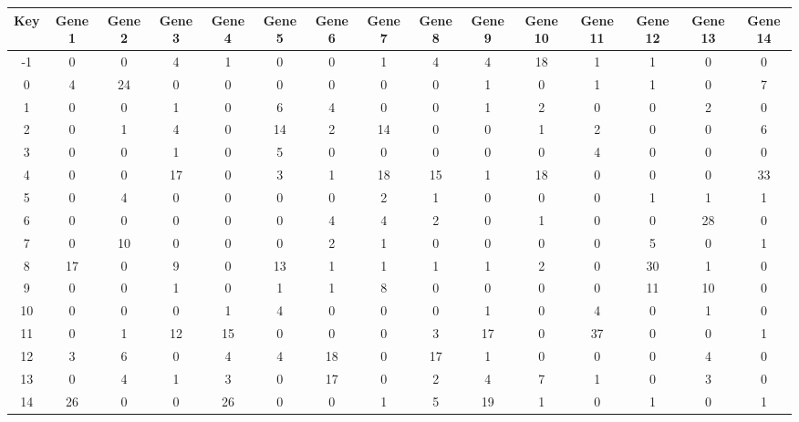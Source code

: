 \begin{tabular}{|c|c|c|c|c|c|c|c|c|c|c|c|c|c|c|}
\hline
Key & Gene 1 & Gene 2 & Gene 3 & Gene 4 & Gene 5 & Gene 6 & Gene 7 & Gene 8 & Gene 9 & Gene 10 & Gene 11 & Gene 12 & Gene 13 & Gene 14 \\
\hline
-1 & 0 & 0 & 4 & 1 & 0 & 0 & 1 & 4 & 4 & 18 & 1 & 1 & 0 & 0 \\
0 & 4 & 24 & 0 & 0 & 0 & 0 & 0 & 0 & 1 & 0 & 1 & 1 & 0 & 7 \\
1 & 0 & 0 & 1 & 0 & 6 & 4 & 0 & 0 & 1 & 2 & 0 & 0 & 2 & 0 \\
2 & 0 & 1 & 4 & 0 & 14 & 2 & 14 & 0 & 0 & 1 & 2 & 0 & 0 & 6 \\
3 & 0 & 0 & 1 & 0 & 5 & 0 & 0 & 0 & 0 & 0 & 4 & 0 & 0 & 0 \\
4 & 0 & 0 & 17 & 0 & 3 & 1 & 18 & 15 & 1 & 18 & 0 & 0 & 0 & 33 \\
5 & 0 & 4 & 0 & 0 & 0 & 0 & 2 & 1 & 0 & 0 & 0 & 1 & 1 & 1 \\
6 & 0 & 0 & 0 & 0 & 0 & 4 & 4 & 2 & 0 & 1 & 0 & 0 & 28 & 0 \\
7 & 0 & 10 & 0 & 0 & 0 & 2 & 1 & 0 & 0 & 0 & 0 & 5 & 0 & 1 \\
8 & 17 & 0 & 9 & 0 & 13 & 1 & 1 & 1 & 1 & 2 & 0 & 30 & 1 & 0 \\
9 & 0 & 0 & 1 & 0 & 1 & 1 & 8 & 0 & 0 & 0 & 0 & 11 & 10 & 0 \\
10 & 0 & 0 & 0 & 1 & 4 & 0 & 0 & 0 & 1 & 0 & 4 & 0 & 1 & 0 \\
11 & 0 & 1 & 12 & 15 & 0 & 0 & 0 & 3 & 17 & 0 & 37 & 0 & 0 & 1 \\
12 & 3 & 6 & 0 & 4 & 4 & 18 & 0 & 17 & 1 & 0 & 0 & 0 & 4 & 0 \\
13 & 0 & 4 & 1 & 3 & 0 & 17 & 0 & 2 & 4 & 7 & 1 & 0 & 3 & 0 \\
14 & 26 & 0 & 0 & 26 & 0 & 0 & 1 & 5 & 19 & 1 & 0 & 1 & 0 & 1 \\
\hline
\end{tabular}